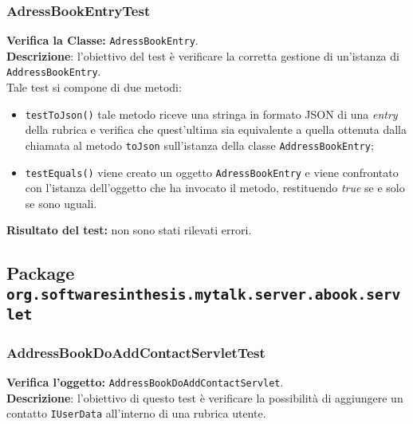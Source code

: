 \subsubsection{AdressBookEntryTest}
\textbf{Verifica la Classe:} \texttt{AdressBookEntry}.\\
\textbf{Descrizione}: l'obiettivo del test è verificare la corretta gestione di un'istanza di \texttt{AddressBookEntry}.\\
Tale test si compone di due metodi:
\begin{itemize}
\item \texttt{testToJson()} tale metodo riceve una stringa in formato JSON di una \textit{entry} della rubrica e verifica che quest'ultima sia equivalente a quella ottenuta dalla chiamata al metodo \texttt{toJson} sull'istanza della classe \texttt{AddressBookEntry};
\item \texttt{testEquals()} viene creato un oggetto \texttt{AdressBookEntry} e viene confrontato con l'istanza dell'oggetto che ha invocato il metodo, restituendo \textit{true} se e solo se sono uguali.
\end{itemize}
\textbf{Risultato del test:} non sono stati rilevati errori.


\subsection{Package \texttt{org.softwaresinthesis.mytalk.server.abook.servlet}}

\subsubsection{AddressBookDoAddContactServletTest}
\textbf{Verifica l'oggetto:} \texttt{AddressBookDoAddContactServlet}.\\
\textbf{Descrizione}: l'obiettivo di questo test è verificare la possibilità di aggiungere un contatto \texttt{IUserData} all'interno di una rubrica utente.

